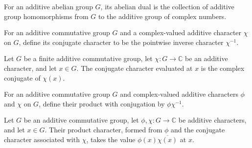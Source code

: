 \begin{definition}
\label{FABL.AbelianDual}
\leanok
For an additive abelian group $G$, its abelian dual is the collection of additive group
homomorphisms from $G$ to the additive group of complex numbers.
\end{definition}

\begin{definition}
\label{FABL.characterConj}
\leanok
{}
For an additive commutative group $G$ and a complex-valued additive character $\chi$ on
$G$, define its conjugate character to be the pointwise inverse character $\chi^{-1}$.
\end{definition}

\begin{theorem}
\label{FABL.characterConj_apply}
\leanok
{}
Let $G$ be a finite additive commutative group, let $\chi:G\to\mathbb C$ be an additive
character, and let $x\in G$. The conjugate character evaluated at $x$ is the complex
conjugate of $\chi(x)$.
\end{theorem}

\begin{definition}
\label{FABL.characterMulConj}
\leanok
{}
For an additive commutative group $G$ and complex-valued additive characters $\phi$ and
$\chi$ on $G$, define their product with conjugation by $\phi\chi^{-1}$.
\end{definition}

\begin{theorem}
\label{FABL.characterMulConj_apply}
\leanok
{}
Let $G$ be an additive commutative group, let $\phi,\chi:G\to\mathbb C$ be additive
characters, and let $x\in G$. Their product character, formed from $\phi$ and the
conjugate character associated with $\chi$, takes the value $\phi(x)\overline{\chi(x)}$
at $x$.
\end{theorem}

